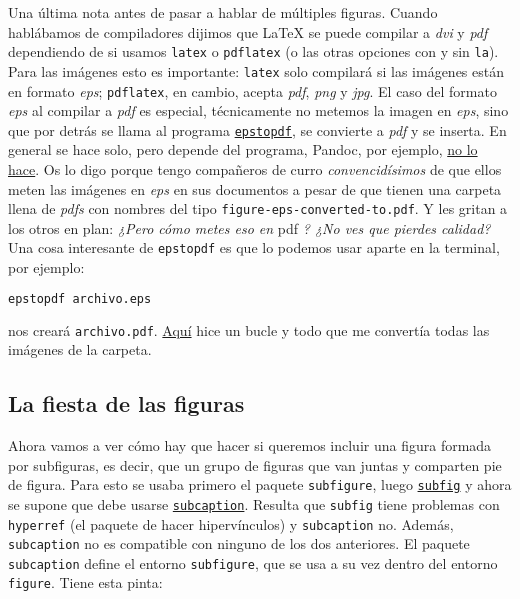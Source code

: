 Una última nota antes de pasar a hablar de múltiples figuras. Cuando
hablábamos de compiladores dijimos que LaTeX se puede compilar a
\emph{dvi} y \emph{pdf} dependiendo de si usamos \lstinline!latex! o
\lstinline!pdflatex! (o las otras opciones con y sin \lstinline!la!).
Para las imágenes esto es importante: \lstinline!latex! solo compilará
si las imágenes están en formato \emph{eps}; \lstinline!pdflatex!, en
cambio, acepta \emph{pdf}, \emph{png} y \emph{jpg}. El caso del formato
\emph{eps} al compilar a \emph{pdf} es especial, técnicamente no metemos
la imagen en \emph{eps}, sino que por detrás se llama al programa
\href{https://www.ctan.org/pkg/epstopdf}{\lstinline!epstopdf!}, se
convierte a \emph{pdf} y se inserta. En general se hace solo, pero
depende del programa, Pandoc, por ejemplo,
\href{https://github.com/jgm/pandoc/commit/a9628d0745784f6f99edfca008d64dcffeb74bc8}{no
lo hace}. Os lo digo porque tengo compañeros de curro
\emph{convencidísimos} de que ellos meten las imágenes en \emph{eps} en
sus documentos a pesar de que tienen una carpeta llena de \emph{pdfs}
con nombres del tipo \lstinline!figure-eps-converted-to.pdf!. Y les
gritan a los otros en plan: \emph{¿Pero cómo metes eso en} pdf \emph{?
¿No ves que pierdes calidad?} Una cosa interesante de
\lstinline!epstopdf! es que lo podemos usar aparte en la terminal, por
ejemplo:

\begin{lstlisting}[language=bash]
epstopdf archivo.eps
\end{lstlisting}

nos creará \lstinline!archivo.pdf!.
\href{https://ondahostil.wordpress.com/2016/05/31/lo-que-he-aprendido-bucle-para-pasar-de-eps-a-pdf-en-cmd/}{Aquí}
hice un bucle y todo que me convertía todas las imágenes de la carpeta.

\subsection{La fiesta de las figuras}\label{sec:fiestaFiguras}

Ahora vamos a ver cómo hay que hacer si queremos incluir una figura
formada por subfiguras, es decir, que un grupo de figuras que van juntas
y comparten pie de figura. Para esto se usaba primero el paquete
\lstinline!subfigure!, luego
\href{http://www.ctan.org/pkg/subfig}{\lstinline!subfig!} y ahora se
supone que debe usarse
\href{https://www.ctan.org/pkg/subcaption}{\lstinline!subcaption!}.
Resulta que \lstinline!subfig! tiene problemas con \lstinline!hyperref!
(el paquete de hacer hipervínculos) y \lstinline!subcaption! no. Además,
\lstinline!subcaption! no es compatible con ninguno de los dos
anteriores. El paquete \lstinline!subcaption! define el entorno
\lstinline!subfigure!, que se usa a su vez dentro del entorno
\lstinline!figure!. Tiene esta pinta:

